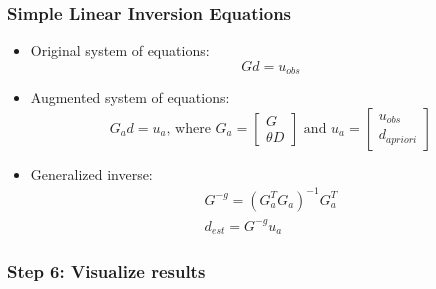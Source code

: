 \documentclass[aspectratio=169]{beamer}
\begin{document}
\begin{frame}
  \frametitle{Simple Linear Inversion Equations}
  \summary{}

  \begin{itemize}
  \item Original system of equations:
    \begin{equation}
      G d = u_\mathit{obs}
    \end{equation}
  \item Augmented system of equations:
    \begin{equation}
      G_a d = u_a \text{, where } 
      G_a = \left[ \begin{array}{c} G \\ \theta D \end{array} \right]
      \text{ and }
      u_a = \left[ \begin{array}{c} u_{obs} \\ d_\mathit{apriori} \end{array} \right]
    \end{equation}
  \item Generalized inverse:
    \begin{gather}
      G^{-g} = \left( G_a^T G_a \right)^{-1} G_a^T \\
      d_{est} = G^{-g} u_a
    \end{gather}
  \end{itemize}
  
\end{frame}


\begin{frame}
  \frametitle{Step 6: Visualize results}

  
\end{frame}

\end{document}
